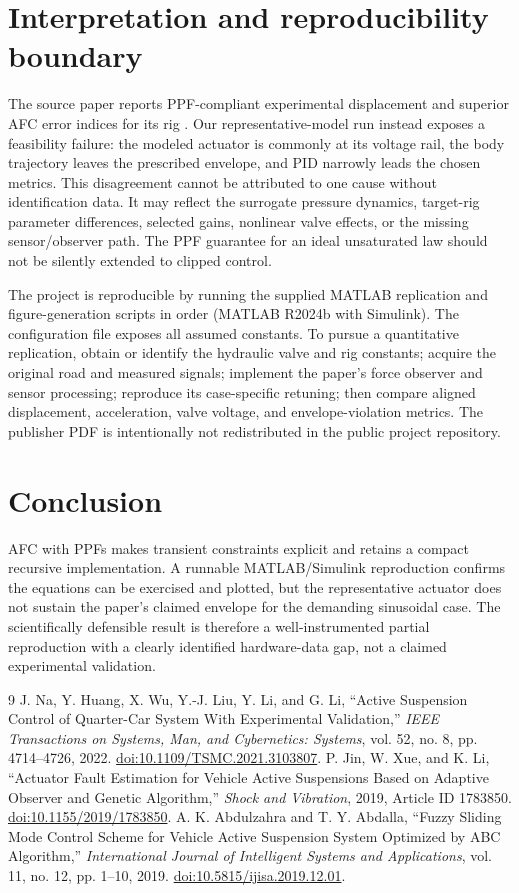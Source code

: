 \documentclass[10pt,a4paper]{article}
\begin{document}
\section{Interpretation and reproducibility boundary}
The source paper reports PPF-compliant experimental displacement and superior AFC error indices for its rig \cite{na2022}. Our representative-model run instead exposes a feasibility failure: the modeled actuator is commonly at its voltage rail, the body trajectory leaves the prescribed envelope, and PID narrowly leads the chosen metrics. This disagreement cannot be attributed to one cause without identification data. It may reflect the surrogate pressure dynamics, target-rig parameter differences, selected gains, nonlinear valve effects, or the missing sensor/observer path. The PPF guarantee for an ideal unsaturated law should not be silently extended to clipped control.

The project is reproducible by running the supplied MATLAB replication and figure-generation scripts in order (MATLAB R2024b with Simulink). The configuration file exposes all assumed constants. To pursue a quantitative replication, obtain or identify the hydraulic valve and rig constants; acquire the original road and measured signals; implement the paper's force observer and sensor processing; reproduce its case-specific retuning; then compare aligned displacement, acceleration, valve voltage, and envelope-violation metrics. The publisher PDF is intentionally not redistributed in the public project repository.

\section{Conclusion}
AFC with PPFs makes transient constraints explicit and retains a compact recursive implementation. A runnable MATLAB/Simulink reproduction confirms the equations can be exercised and plotted, but the representative actuator does not sustain the paper's claimed envelope for the demanding sinusoidal case. The scientifically defensible result is therefore a well-instrumented partial reproduction with a clearly identified hardware-data gap, not a claimed experimental validation.

\small
\begin{thebibliography}{9}
 J. Na, Y. Huang, X. Wu, Y.-J. Liu, Y. Li, and G. Li, ``Active Suspension Control of Quarter-Car System With Experimental Validation,'' \emph{IEEE Transactions on Systems, Man, and Cybernetics: Systems}, vol. 52, no. 8, pp. 4714--4726, 2022. \href{https://doi.org/10.1109/TSMC.2021.3103807}{doi:10.1109/TSMC.2021.3103807}.
 P. Jin, W. Xue, and K. Li, ``Actuator Fault Estimation for Vehicle Active Suspensions Based on Adaptive Observer and Genetic Algorithm,'' \emph{Shock and Vibration}, 2019, Article ID 1783850. \href{https://doi.org/10.1155/2019/1783850}{doi:10.1155/2019/1783850}.
 A. K. Abdulzahra and T. Y. Abdalla, ``Fuzzy Sliding Mode Control Scheme for Vehicle Active Suspension System Optimized by ABC Algorithm,'' \emph{International Journal of Intelligent Systems and Applications}, vol. 11, no. 12, pp. 1--10, 2019. \href{https://doi.org/10.5815/ijisa.2019.12.01}{doi:10.5815/ijisa.2019.12.01}.
\end{thebibliography}
\end{document}
